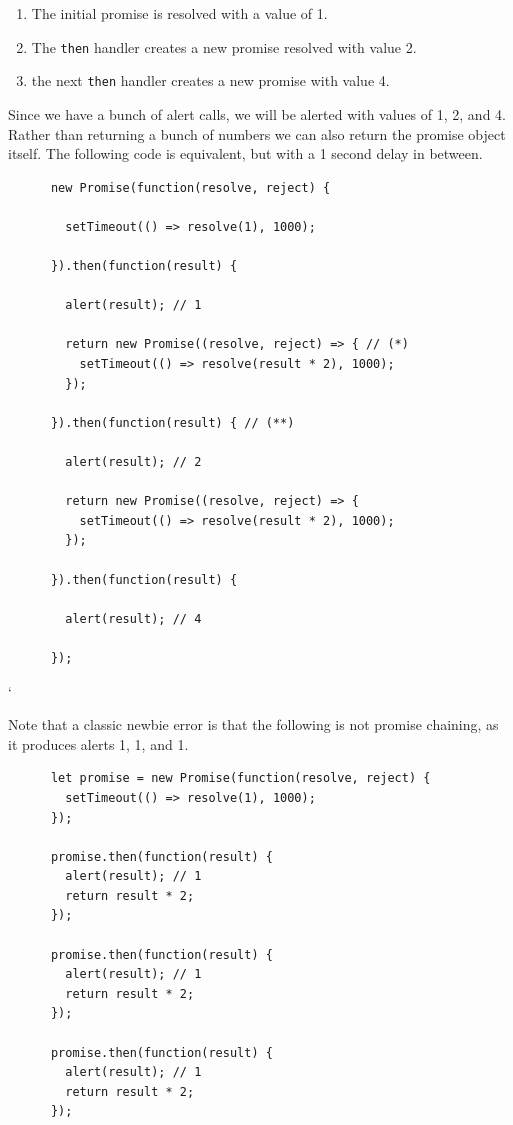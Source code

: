 \documentclass{article}
\newcounter{code}[section]
\begin{document}
    \begin{enumerate}
      \item The initial promise is resolved with a value of 1. 
      \item The \texttt{then} handler creates a new promise resolved with value 2. 
      \item the next \texttt{then} handler creates a new promise with value 4. 
    \end{enumerate}

    Since we have a bunch of alert calls, we will be alerted with values of 1, 2, and 4. Rather than returning a bunch of numbers we can also return the promise object itself. The following code is equivalent, but with a 1 second delay in between. 

    \begin{lstlisting}
      new Promise(function(resolve, reject) {

        setTimeout(() => resolve(1), 1000);

      }).then(function(result) {

        alert(result); // 1

        return new Promise((resolve, reject) => { // (*)
          setTimeout(() => resolve(result * 2), 1000);
        });

      }).then(function(result) { // (**)

        alert(result); // 2

        return new Promise((resolve, reject) => {
          setTimeout(() => resolve(result * 2), 1000);
        });

      }).then(function(result) {

        alert(result); // 4

      });
    \end{lstlisting}`

    Note that a classic newbie error is that the following is not promise chaining, as it produces alerts 1, 1, and 1. 

    \begin{lstlisting}
      let promise = new Promise(function(resolve, reject) {
        setTimeout(() => resolve(1), 1000);
      });

      promise.then(function(result) {
        alert(result); // 1
        return result * 2;
      });

      promise.then(function(result) {
        alert(result); // 1
        return result * 2;
      });

      promise.then(function(result) {
        alert(result); // 1
        return result * 2;
      });
    \end{lstlisting}
\end{document}
